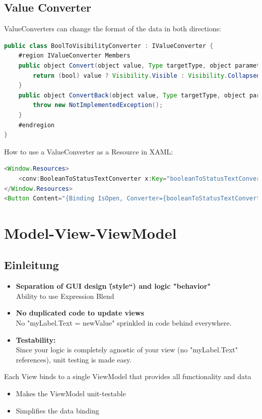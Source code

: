 \documentclass[10pt]{article}
\begin{document}
\subsection{Value Converter}
ValueConverters can change the format of the data in both directions:
\begin{lstlisting}[language=Java, caption=Value Converter, style=JavaStyle]
public class BoolToVisibilityConverter : IValueConverter {
	#region IValueConverter Members
	public object Convert(object value, Type targetType, object parameter, CultureInfo culture) {
		return (bool) value ? Visibility.Visible : Visibility.Collapsed;
	}
	public object ConvertBack(object value, Type targetType, object parameter,  CultureInfo culture) {
		throw new NotImplementedException();
	}
	#endregion
}	
\end{lstlisting}
How to use a ValueConverter as a Resource in XAML:
\begin{lstlisting}[language=Java, caption=Value Converter, style=JavaStyle]
<Window.Resources>
	<conv:BooleanToStatusTextConverter x:Key="booleanToStatusTextConverter" />
</Window.Resources>
<Button Content="{Binding IsOpen, Converter={booleanToStatusTextConverter}}" />
\end{lstlisting}

\pagebreak
\section{Model-View-ViewModel}
\subsection{Einleitung}
\begin{itemize}
	\item \textbf{Separation of GUI design (\"{}style“) and logic "behavior" }\\ Ability to use Expression Blend
	\item \textbf{No duplicated code to update views} \\ No "myLabel.Text = newValue" sprinkled in code behind everywhere.
	\item \textbf{Testability: }\\ Since your logic is completely agnostic of your view (no "myLabel.Text" references), unit testing is made easy.
\end{itemize}
Each View binds to a single ViewModel that provides all functionality and data
\begin{itemize}
	\item Makes the ViewModel unit-testable
	\item Simplifies the data binding
\end{itemize}
\end{document}
